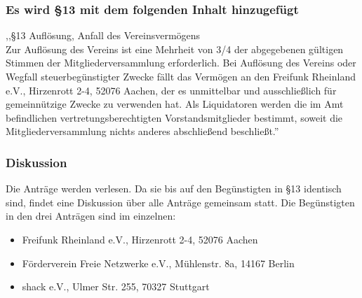 \documentclass[a4paper]{scrartcl}
\begin{document}
\subsubsection{Es wird §13 mit dem folgenden Inhalt hinzugefügt}

,,§13 Auflösung, Anfall des Vereinsvermögens\\
Zur Auflösung des Vereins ist eine Mehrheit von 3/4 der abgegebenen gültigen Stimmen der Mitgliederversammlung erforderlich. Bei Auflösung des Vereins oder Wegfall steuerbegünstigter Zwecke fällt das Vermögen an den Freifunk Rheinland e.V., Hirzenrott 2-4, 52076 Aachen, der es unmittelbar und ausschließlich für gemeinnützige Zwecke zu verwenden hat. Als Liquidatoren werden die im Amt befindlichen vertretungsberechtigten Vorstandsmitglieder bestimmt, soweit die Mitgliederversammlung nichts anderes abschließend beschließt.''

\subsubsection{Diskussion}

Die Anträge werden verlesen. Da sie bis auf den Begünstigten in §13 identisch sind, findet eine Diskussion über alle Anträge gemeinsam statt. Die Begünstigten in den drei Anträgen sind im einzelnen:
\begin{itemize}
\item Freifunk Rheinland e.V., Hirzenrott 2-4, 52076 Aachen
\item Förderverein Freie Netzwerke e.V., Mühlenstr. 8a, 14167 Berlin
\item shack e.V., Ulmer Str. 255, 70327 Stuttgart
\end{itemize}
\end{document}
